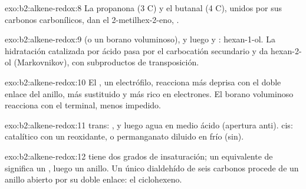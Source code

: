 \begin{solution}{exo:b2:alkene-redox:8}
La propanona (3 C) y el butanal (4 C), unidos por sus carbonos carbonílicos, dan el 2-metilhex-2-eno,
.
\end{solution}

\begin{solution}{exo:b2:alkene-redox:9}
 (o un borano voluminoso), y luego  y : hexan-1-ol. La hidratación catalizada por ácido
pasa por el carbocatión secundario y da hexan-2-ol (Markovnikov), con
subproductos de transposición.
\end{solution}

\begin{solution}{exo:b2:alkene-redox:10}
El , un electrófilo, reacciona más deprisa con el doble enlace del anillo, más sustituido y más rico
en electrones. El borano voluminoso reacciona con el  terminal, menos impedido.
\end{solution}

\begin{solution}{exo:b2:alkene-redox:11}
trans: , y luego agua en medio ácido (apertura anti). cis:  catalítico con un
reoxidante, o permanganato diluido en frío (sin).
\end{solution}

\begin{solution}{exo:b2:alkene-redox:12}
 tiene dos grados de insaturación; un equivalente de  significa un , luego
un anillo. Un único dialdehído de seis carbonos procede de un anillo abierto por su doble enlace:
el ciclohexeno.
\end{solution}

